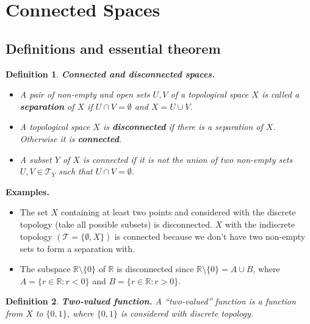 \documentclass[two column]{article}
\newtheorem{definition}{Definition}[subsection]
\begin{document}
\section{Connected Spaces}

\subsection{Definitions and essential theorem}

\begin{definition}
{\bf Connected and disconnected spaces.} 
\begin{itemize}
\item A pair of non-empty and open sets $U,V$ of a topological space $X$ is called a {\bf separation} of $X$ if $U \cap V = \emptyset$ and $X = U \cup V$. 
\item A topological space $X$ is {\bf disconnected} if there is a separation of $X$. Otherwise it is {\bf connected}. 
\item A subset $Y$ of $X$ is connected if it is not the union of two non-empty sets $U,V \in \mathcal{T}_{Y}$ such that $U \cap V = \emptyset$. 
\end{itemize}
\end{definition}

{\bf Examples.}
\begin{itemize}
\item The set $X$ containing at least two points and considered with the discrete topology (take all possible subsets) is disconnected. $X$ with the indiscrete topology $(\mathcal{T} = \{\emptyset, X\})$ is connected because we don't have two non-empty sets to form a separation with.  
\item The subspace $\mathbb{R} \setminus \{0\}$ of $\mathbb{R}$ is disconnected since $\mathbb{R} \setminus \{0\} = A \cup B$, where $A = \{r \in \mathbb{R}: r < 0 \}$ and $B = \{r \in \mathbb{R}: r > 0 \}$.\\
\end{itemize}

\begin{definition}
{\bf Two-valued function.} A ``two-valued'' function is a function from $X$ to $\{0,1\}$, where $\{0,1\}$ is considered with discrete topology.  \\
\end{definition}
\end{document}
